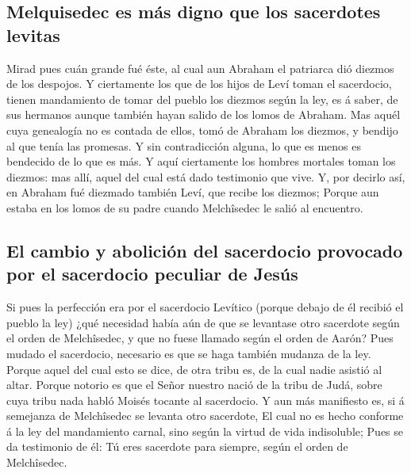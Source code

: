 \hypertarget{melquisedec-es-muxe1s-digno-que-los-sacerdotes-levitas}{%
\subsection{Melquisedec es más digno que los sacerdotes
levitas}\label{melquisedec-es-muxe1s-digno-que-los-sacerdotes-levitas}}

 Mirad pues cuán grande fué éste, al cual aun Abraham el
patriarca dió diezmos de los despojos.  Y ciertamente los
que de los hijos de Leví toman el sacerdocio, tienen mandamiento de
tomar del pueblo los diezmos según la ley, es á saber, de sus hermanos
aunque también hayan salido de los lomos de Abraham.  Mas
aquél cuya genealogía no es contada de ellos, tomó de Abraham los
diezmos, y bendijo al que tenía las promesas.  Y sin
contradicción alguna, lo que es menos es bendecido de lo que es más.
 Y aquí ciertamente los hombres mortales toman los
diezmos: mas allí, aquel del cual está dado testimonio que vive.
 Y, por decirlo así, en Abraham fué diezmado también Leví,
que recibe los diezmos;  Porque aun estaba en los lomos
de su padre cuando Melchîsedec le salió al encuentro.

\hypertarget{el-cambio-y-aboliciuxf3n-del-sacerdocio-provocado-por-el-sacerdocio-peculiar-de-jesuxfas}{%
\subsection{El cambio y abolición del sacerdocio provocado por el
sacerdocio peculiar de
Jesús}\label{el-cambio-y-aboliciuxf3n-del-sacerdocio-provocado-por-el-sacerdocio-peculiar-de-jesuxfas}}

 Si pues la perfección era por el sacerdocio Levítico
(porque debajo de él recibió el pueblo la ley) ¿qué necesidad había aún
de que se levantase otro sacerdote según el orden de Melchîsedec, y que
no fuese llamado según el orden de Aarón?  Pues mudado el
sacerdocio, necesario es que se haga también mudanza de la ley.
 Porque aquel del cual esto se dice, de otra tribu es, de
la cual nadie asistió al altar.  Porque notorio es que el
Señor nuestro nació de la tribu de Judá, sobre cuya tribu nada habló
Moisés tocante al sacerdocio.  Y aun más manifiesto es,
si á semejanza de Melchîsedec se levanta otro sacerdote, 
El cual no es hecho conforme á la ley del mandamiento carnal, sino según
la virtud de vida indisoluble;  Pues se da testimonio de
él: Tú eres sacerdote para siempre, según el orden de Melchîsedec.

